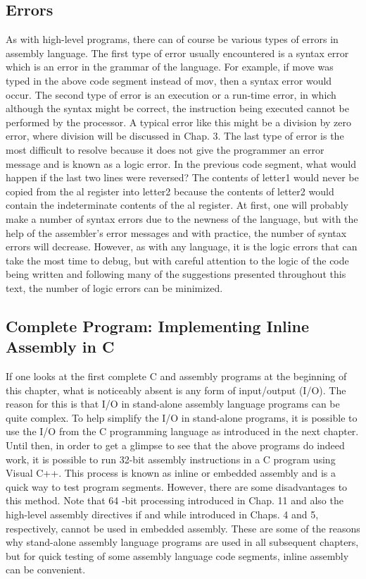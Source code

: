 \documentclass[10pt]{book}
\begin{document}
\subsection{Errors}
As with high-level programs, there can of course be various types of errors in assembly language. The first type of error usually encountered is a syntax error which is an error in the grammar of the language. For example, if move was typed in the above code segment instead of mov, then a syntax error would occur. The second type of error is an execution or a run-time error, in which although the syntax might be correct, the instruction being executed cannot be performed by the processor. A typical error like this might be a division by zero error, where division will be discussed in Chap. 3. The last type of error is the most difficult to resolve because it does not give the programmer an error message and is known as a logic error. In the previous code segment, what would happen if the last two lines were reversed? The contents of letter1 would never be copied from the al register into letter2 because the contents of letter2 would contain the indeterminate contents of the al register. At first, one will probably make a number of syntax errors due to the newness of the language, but with the help of the assembler's error messages and with practice, the number of syntax errors will decrease. However, as with any language, it is the logic errors that can take the most time to debug, but with careful attention to the logic of the code being written and following many of the suggestions presented throughout this text, the number of logic errors can be minimized.

\subsection{Complete Program: Implementing Inline Assembly in C}
If one looks at the first complete C and assembly programs at the beginning of this chapter, what is noticeably absent is any form of input/output (I/O). The reason for this is that I/O in stand-alone assembly language programs can be quite complex. To help simplify the I/O in stand-alone programs, it is possible to use the I/O from the C programming language as introduced in the next chapter. Until then, in order to get a glimpse to see that the above programs do indeed work, it is possible to run 32-bit assembly instructions in a C program using Visual C++. This process is known as inline or embedded assembly and is a quick way to test program segments. However, there are some disadvantages to this method. Note that 64 -bit processing introduced in Chap. 11 and also the high-level assembly directives if and while introduced in Chaps. 4 and 5, respectively, cannot be used in embedded assembly. These are some of the reasons why stand-alone assembly language programs are used in all subsequent chapters, but for quick testing of some assembly language code segments, inline assembly can be convenient.
\end{document}
